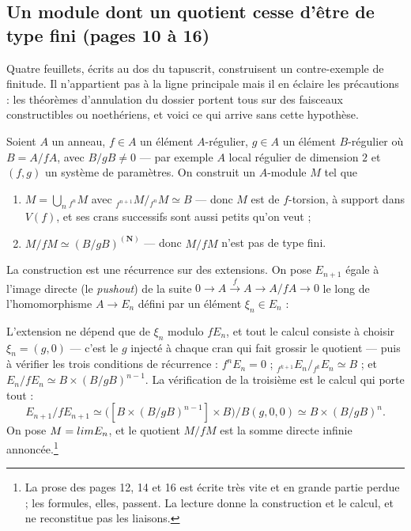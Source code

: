 \documentclass[11pt,a4paper]{article}
\begin{document}
\subsection*{Un module dont un quotient cesse d'être de type fini (pages 10 à 16)}

Quatre feuillets, écrits au dos du tapuscrit, construisent un contre-exemple de
finitude. Il n'appartient pas à la ligne principale mais il en éclaire les
précautions : les théorèmes d'annulation du dossier portent tous sur des
faisceaux constructibles ou noethériens, et voici ce qui arrive sans cette
hypothèse.

Soient $A$ un anneau, $f \in A$ un élément $A$-régulier, $g \in A$ un élément
$B$-régulier où $B = A/fA$, avec $B/gB \neq 0$ — par exemple $A$ local régulier
de dimension $2$ et $(f,g)$ un système de paramètres. On construit un
$A$-module $M$ tel que
\begin{enumerate}
\item[(i)] $M = \bigcup_{n} {}_{f^n}M$ avec
${}_{f^{n+1}}M/{}_{f^n}M \simeq B$ — donc $M$ est de $f$-torsion, à support
dans $V(f)$, et ses crans successifs sont aussi petits qu'on veut ;
\item[(ii)] $M/fM \simeq (B/gB)^{(\mathbf{N})}$ — donc $M/fM$ n'est pas de type
fini.
\end{enumerate}

La construction est une récurrence sur des extensions. On pose $E_{n+1}$ égale
à l'image directe (le \emph{pushout}) de la suite
$0 \to A \xrightarrow{f} A \to A/fA \to 0$ le long de l'homomorphisme
$A \to E_n$ défini par un élément $\xi_n \in E_n$ :


L'extension ne dépend que de $\xi_n$ modulo $fE_n$, et tout le calcul consiste à
choisir $\xi_n = (g,0)$ — c'est le $g$ injecté à chaque cran qui fait grossir
le quotient — puis à vérifier les trois conditions de récurrence :
$f^n E_n = 0$ ; ${}_{f^{k+1}}E_n/{}_{f^k}E_n \simeq B$ ; et
$E_n/fE_n \simeq B \times (B/gB)^{n-1}$. La vérification de la troisième est le
calcul qui porte tout :
\[
E_{n+1}/fE_{n+1} \simeq
\bigl([B \times (B/gB)^{n-1}] \times B\bigr) \big/ B(g,0,0)
\simeq B \times (B/gB)^{n}.
\]
On pose $M = \varinjlim E_n$, et le quotient $M/fM$ est la somme directe
infinie annoncée.\footnote{La prose des pages 12, 14 et 16 est écrite très vite
et en grande partie perdue ; les formules, elles, passent. La lecture donne la
construction et le calcul, et ne reconstitue pas les liaisons.}
\end{document}
